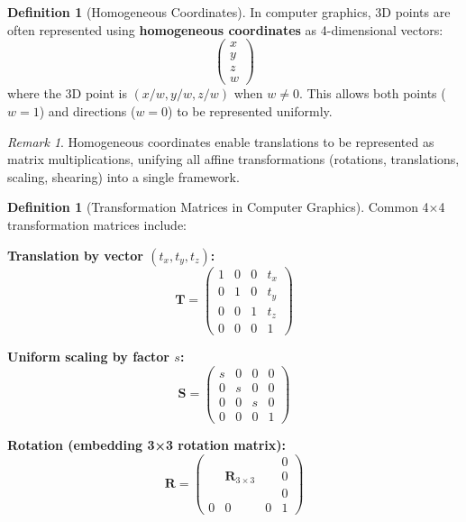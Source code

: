 \documentclass[12pt]{article}
\numberwithin{equation}{section}
\newcommand{\mat}[1]{\mathbf{#1}}        %
\theoremstyle{plain}
\theoremstyle{definition}
\newtheorem{definition}[theorem]{Definition}
\theoremstyle{remark}
\newtheorem{remark}[theorem]{Remark}
\begin{document}
\begin{definition}[Homogeneous Coordinates]
In computer graphics, 3D points are often represented using \textbf{homogeneous coordinates} as 4-dimensional vectors:
$$\begin{pmatrix} x \\ y \\ z \\ w \end{pmatrix}$$
where the 3D point is $(x/w, y/w, z/w)$ when $w \neq 0$. This allows both points ($w = 1$) and directions ($w = 0$) to be represented uniformly.
\end{definition}

\begin{remark}
Homogeneous coordinates enable translations to be represented as matrix multiplications, unifying all affine transformations (rotations, translations, scaling, shearing) into a single framework.
\end{remark}

\begin{definition}[Transformation Matrices in Computer Graphics]
Common 4×4 transformation matrices include:

\textbf{Translation by vector $(t_x, t_y, t_z)$:}
$$\mat{T} = \begin{pmatrix} 1 & 0 & 0 & t_x \\ 0 & 1 & 0 & t_y \\ 0 & 0 & 1 & t_z \\ 0 & 0 & 0 & 1 \end{pmatrix}$$

\textbf{Uniform scaling by factor $s$:}
$$\mat{S} = \begin{pmatrix} s & 0 & 0 & 0 \\ 0 & s & 0 & 0 \\ 0 & 0 & s & 0 \\ 0 & 0 & 0 & 1 \end{pmatrix}$$

\textbf{Rotation (embedding 3×3 rotation matrix):}
$$\mat{R} = \begin{pmatrix} & & & 0 \\ & \mat{R}_{3 \times 3} & & 0 \\ & & & 0 \\ 0 & 0 & 0 & 1 \end{pmatrix}$$
\end{definition}
\end{document}
